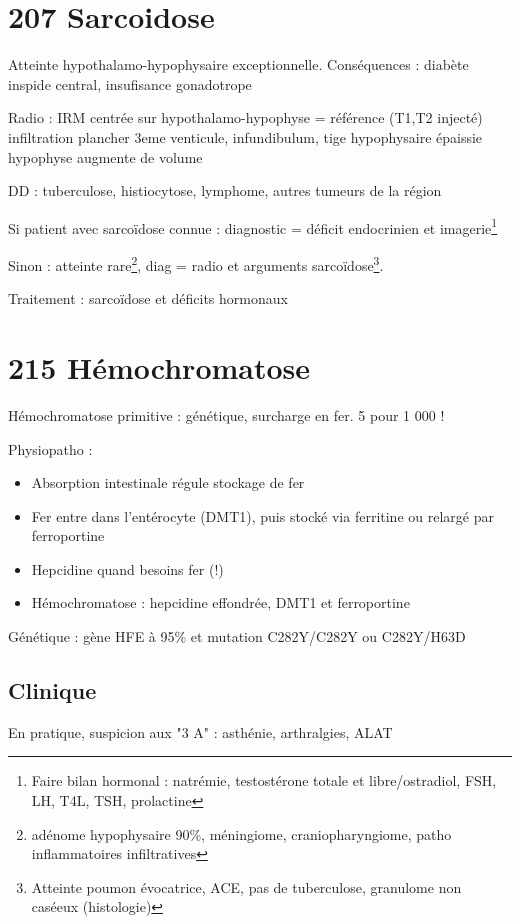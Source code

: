 \documentclass{book}
\begin{document}
\section{207 \textdagger{} Sarcoidose}
\label{sec:org149ba82}
Atteinte hypothalamo-hypophysaire exceptionnelle. Conséquences : diabète
inspide central, insufisance gonadotrope

Radio : IRM centrée sur hypothalamo-hypophyse = référence (T1,T2 injecté) \thus
infiltration plancher 3eme venticule, infundibulum, tige hypophysaire épaissie
\textpm{} hypophyse augmente de volume

DD : tuberculose, histiocytose, lymphome, autres tumeurs de la région 

Si patient avec sarcoïdose connue : diagnostic = déficit endocrinien et imagerie\footnote{Faire bilan hormonal : natrémie, testostérone totale et libre/ostradiol,
FSH, LH, T4L, TSH, prolactine}

Sinon : atteinte rare\footnote{adénome hypophysaire 90\%, méningiome, craniopharyngiome, patho
inflammatoires infiltratives}, diag = radio et arguments sarcoïdose\footnote{Atteinte poumon évocatrice, \inc{} ACE, pas de tuberculose, granulome
non caséeux (histologie)}.

Traitement : sarcoïdose et déficits hormonaux

\section{215 \textdagger{} Hémochromatose}
\label{sec:orgc6133d7}
Hémochromatose primitive : génétique, surcharge en fer. 5 pour 1 000 !

Physiopatho : 
\begin{itemize}
\item Absorption intestinale régule stockage de fer
\item Fer entre dans l'entérocyte (DMT1), puis stocké via ferritine ou relargé par ferroportine
\item Hepcidine \dec quand besoins fer \inc (!)
\item Hémochromatose : hepcidine effondrée, DMT1 et ferroportine \inc
\end{itemize}

Génétique : gène HFE à 95\% et mutation C282Y/C282Y ou C282Y/H63D

\subsection{Clinique}
\label{sec:orga7b753a}
En pratique, suspicion aux "3 A" : asthénie, arthralgies, \inc ALAT
\end{document}
